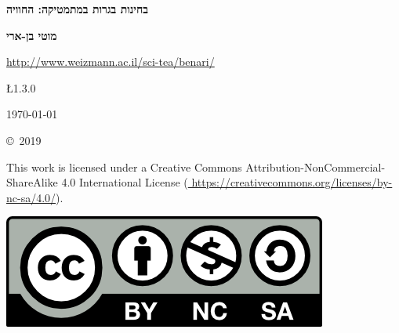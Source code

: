 

\thispagestyle{empty}

\begin{center}
\textbf{\LARGE בחינות בגרות במתמטיקה: החוויה}
\end{center}

\bigskip
\bigskip

\begin{center}
\textbf{\Large מוטי בן-ארי}

\bigskip

\url{http://www.weizmann.ac.il/sci-tea/benari/}
\end{center}

\begin{center}	
\begin{bfseries}
\bigskip
\bigskip

 \L{1.3.0} 

\bigskip

\today

\end{bfseries}
\end{center}

\vfill


\begin{small}
\begin{center}
\copyright{}\ 2019 
\end{center}
This work is licensed under a Creative Commons Attribution-NonCommercial-ShareAlike 4.0 International License (\url{
https://creativecommons.org/licenses/by-nc-sa/4.0/}).
\end{small}

\bigskip

\begin{center}
\includegraphics[width=.3\textwidth]{../../by-nc-sa.png}
\end{center}

\np

\thispagestyle{empty}

\mbox{}

\np

\thispagestyle{empty}

\tableofcontents
\np

